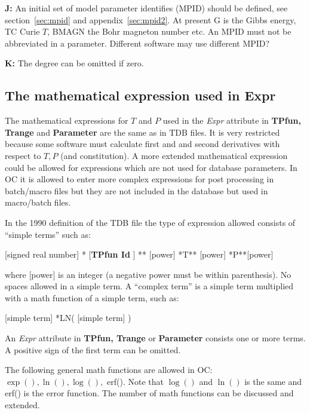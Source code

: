 \documentclass{article}
\begin{document}
\begin{description}
\item{\bf J:} An initial set of model parameter identifies (MPID)
  should be defined, see section~\ref{sec:mpid} and
  appendix~\ref{sec:mpid2}.  At present G is the Gibbs energy, TC
  Curie $T$, BMAGN the Bohr magneton number etc.  An MPID must not be
  abbreviated in a parameter.  Different software may use different
  MPID?

\item{\bf K:} The degree can be omitted if zero.


\end{description}

\newpage 

\subsection{The mathematical expression used in Expr}\label{sec:expr}

The mathematical expressions for $T$ and $P$ used in the {\em Expr}
attribute in {\bf TPfun, Trange} and {\bf Parameter} are the same as
in TDB files.  It is very restricted because some software must
calculate first and and second derivatives with respect to $T, P$ (and
constitution).  A more extended mathematical expression could be
allowed for expressions which are not used for database parameters.
In OC it is allowed to enter more complex expressions for post
processing in batch/macro files but they are not included in the
database but used in macro/batch files.

In the 1990 definition of the TDB file the type of expression allowed
consists of ``simple terms'' such as:

[signed real number] * [{\bf TPfun Id} ] ** [power] *T** [power] *P**[power]

where [power] is an integer (a negative power must be within
parenthesis).  No spaces allowed in a simple term.  A ``complex term''
is a simple term multiplied with a math function of a simple term,
such as:

[simple term] *LN( [simple term] )

An {\em Expr} attribute in {\bf TPfun, Trange} or {\bf Parameter}
consists one or more terms.  A positive sign of the first term can be
omitted.
  
The following general math functions are allowed in OC:\\ $\exp(),
\ln(), \log(),$ erf().  Note that $\log()$ and $\ln()$ is the same and
erf() is the error function.  The number of math functions can be
discussed and extended.
\end{document}
